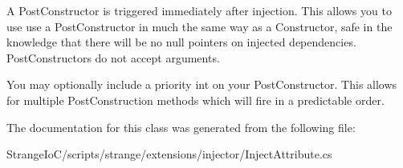 A Post\-Constructor is triggered immediately after injection. This allows you to use use a Post\-Constructor in much the same way as a Constructor, safe in the knowledge that there will be no null pointers on injected dependencies. Post\-Constructors do not accept arguments.

You may optionally include a priority int on your Post\-Constructor. This allows for multiple Post\-Construction methods which will fire in a predictable order. 

The documentation for this class was generated from the following file\-:\begin{DoxyCompactItemize}
\item 
Strange\-Io\-C/scripts/strange/extensions/injector/Inject\-Attribute.\-cs\end{DoxyCompactItemize}

